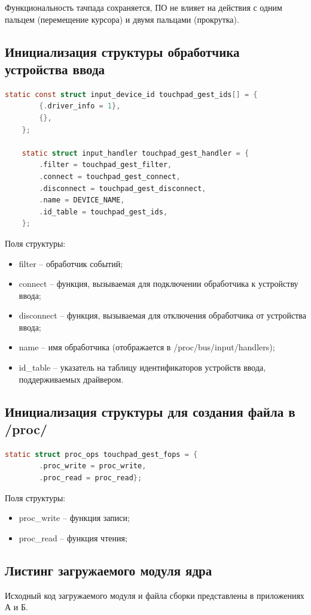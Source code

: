 Функциональность тачпада сохраняется, ПО не влияет на действия с одним пальцем (перемещение курсора) и двумя пальцами (прокрутка).


\subsection{Инициализация структуры обработчика устройства ввода}

\begin{lstlisting}[label=lst:shandler,caption=Заполнение структур обработчика ввода, language=c]
	static const struct input_device_id touchpad_gest_ids[] = {
		{.driver_info = 1},
		{},
	};
	
	static struct input_handler touchpad_gest_handler = {
		.filter = touchpad_gest_filter,
		.connect = touchpad_gest_connect,
		.disconnect = touchpad_gest_disconnect,
		.name = DEVICE_NAME,
		.id_table = touchpad_gest_ids,
	};
\end{lstlisting}

Поля структуры:
\begin{itemize}
	\item filter -- обработчик событий;
	\item connect -- функция, вызываемая для подключении обработчика к устройству ввода;
	\item disconnect -- функция, вызываемая для отключения обработчика от устройства ввода;
	\item name -- имя обработчика (отображается в /proc/bus/input/handlers);
	\item id\_table -- указатель на таблицу идентификаторов устройств ввода, поддерживаемых драйвером.
\end{itemize}

\subsection{Инициализация структуры для создания файла в /proc/}

\begin{lstlisting}[label=lst:sproc,caption=Заполнение структуры proc, language=c]
	static struct proc_ops touchpad_gest_fops = {
		.proc_write = proc_write,
		.proc_read = proc_read};
\end{lstlisting}

Поля структуры:
\begin{itemize}
	\item proc\_write -- функция записи;
	\item proc\_read -- функция чтения;
\end{itemize}

\subsection{Листинг загружаемого модуля ядра}

Исходный код загружаемого модуля и файла сборки представлены в приложениях А и Б.

\clearpage